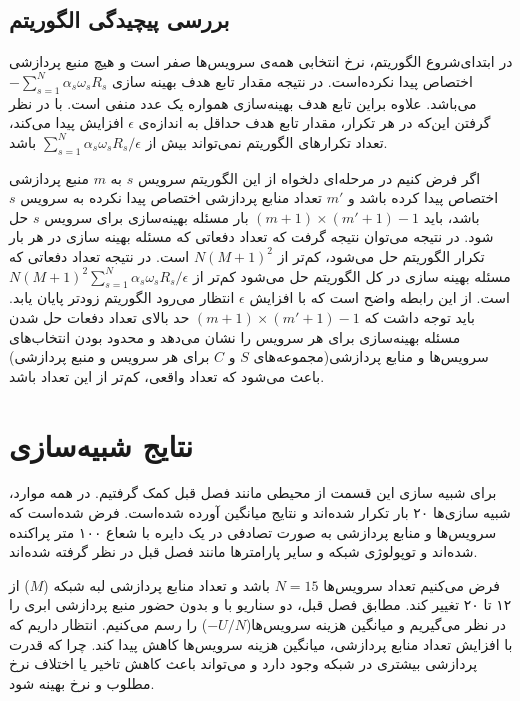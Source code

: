     \subsection{بررسی پیچیدگی الگوریتم}
      در ابتدای‌شروع الگوریتم، نرخ انتخابی همه‌ی سرویس‌ها صفر است و هیچ منبع پردازشی اختصاص پیدا نکرده‌است.
      در نتیجه مقدار تابع هدف بهینه سازی $-\sum_{s=1}^N \alpha_s \omega_s R_s$ می‌باشد.
      علاوه براین تابع هدف بهینه‌سازی همواره یک عدد منفی است.
      با در نظر گرفتن این‌که در هر تکرار، مقدار تابع هدف حداقل به اندازه‌ی $\epsilon$ افزایش پیدا می‌کند، تعداد تکرار‌های الگوریتم نمی‌تواند بیش از $\sum_{s=1}^N  \alpha_s \omega_s R_s / \epsilon$  باشد.
      
      اگر فرض کنیم در مرحله‌ای دلخواه از این الگوریتم سرویس $s$ به $m$ منبع پردازشی اختصاص پیدا کرده باشد و $m'$ تعداد منابع پردازشی اختصاص پیدا نکرده به سرویس $s$ باشد، باید $(m+1) \times (m'+1) - 1$ بار مسئله بهینه‌سازی برای سرویس $s$ حل شود.
      در نتیجه می‌توان نتیجه گرفت که تعداد دفعاتی که مسئله بهینه سازی در هر بار تکرار الگوریتم حل می‌شود، کم‌تر از $N(M+1)^2$ است.
      در نتیجه تعداد دفعاتی که مسئله بهینه سازی در کل الگوریتم حل می‌شود کم‌تر از $N(M+1)^2 \sum_{s=1}^N  \alpha_s \omega_s R_s / \epsilon$ است.
      از این رابطه واضح است که با افزایش $\epsilon$ انتظار می‌رود الگوریتم زود‌تر پایان یابد.
      باید توجه داشت که $(m+1) \times (m'+1) - 1$ حد بالای تعداد دفعات حل شدن مسئله بهینه‌سازی برای هر سرویس را نشان می‌دهد و محدود بودن انتخاب‌های سرویس‌ها و منابع پردازشی(مجموعه‌های $S$ و $C$ برای هر سرویس و منبع پردازشی) باعث می‌شود که تعداد واقعی، کم‌تر از این تعداد باشد.

  \section{نتایج شبیه‌سازی}
    برای شبیه سازی این قسمت از محیطی مانند فصل قبل کمک گرفتیم.
    در همه موارد، شبیه سازی‌ها ۲۰ بار تکرار شده‌اند و نتایج میانگین آورده شده‌است.
    فرض شده‌است که سرویس‌ها و منابع پردازشی به صورت تصادفی در یک دایره با شعاع ۱۰۰ متر پراکنده شده‌اند و توپولوژی شبکه و سایر پارامتر‌ها مانند فصل قبل در نظر گرفته شده‌اند.
    
    فرض می‌کنیم تعداد سرویس‌ها $N=15$ باشد و تعداد منابع پردازشی لبه شبکه ($M$) از ۱۲ تا ۲۰ تغییر کند.
    مطابق فصل قبل، دو سناریو با و بدون حضور منبع پردازشی ابری را در نظر می‌گیریم و میانگین هزینه سرویس‌ها($-U/N$) را رسم می‌کنیم.
    انتظار داریم که با افزایش تعداد منابع پردازشی، میانگین هزینه سرویس‌ها کاهش پیدا کند. چرا که قدرت پردازشی بیشتری در شبکه وجود دارد و می‌تواند باعث کاهش تاخیر یا اختلاف نرخ مطلوب و نرخ بهینه شود.

